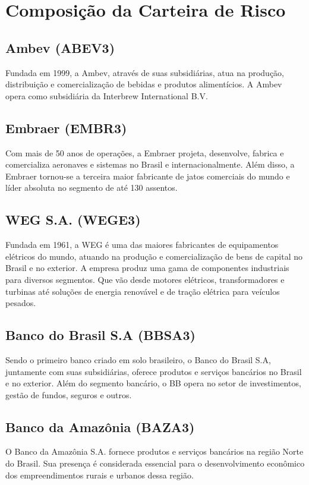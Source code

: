 \documentclass[letterpaper,12pt]{article}
\begin{document}
\section{Composição da Carteira de Risco}

\subsection{Ambev (ABEV3)}
Fundada em 1999, a Ambev, através de suas subsidiárias, atua na produção, distribuição e comercialização de bebidas e produtos alimentícios. A Ambev opera como subsidiária da Interbrew International B.V.

\subsection{Embraer (EMBR3)}
 Com mais de 50 anos de operações, a Embraer projeta, desenvolve, fabrica e comercializa aeronaves e sistemas no Brasil e internacionalmente. Além disso, a Embraer tornou-se a terceira maior fabricante de jatos comerciais do mundo e líder absoluta no segmento de até 130 assentos.

\subsection{WEG S.A. (WEGE3)}
Fundada em 1961, a WEG é uma das maiores fabricantes de equipamentos elétricos do mundo, atuando na produção e comercialização de bens de capital no Brasil e no exterior. A empresa produz uma gama de componentes industriais para diversos segmentos. Que vão desde motores elétricos, transformadores e turbinas até soluções de energia renovável e de tração elétrica para veículos pesados.

\subsection{Banco do Brasil S.A (BBSA3)}
Sendo o primeiro banco criado em solo brasileiro, o Banco do Brasil S.A, juntamente com suas subsidiárias, oferece produtos e serviços bancários no Brasil e no exterior. Além do segmento bancário, o BB opera no setor de investimentos, gestão de fundos, seguros e outros.

\subsection{Banco da Amazônia (BAZA3)}
O Banco da Amazônia S.A. fornece produtos e serviços bancários na região Norte do Brasil. Sua presença é considerada essencial para o desenvolvimento econômico dos empreendimentos rurais e urbanos dessa região.
\end{document}
